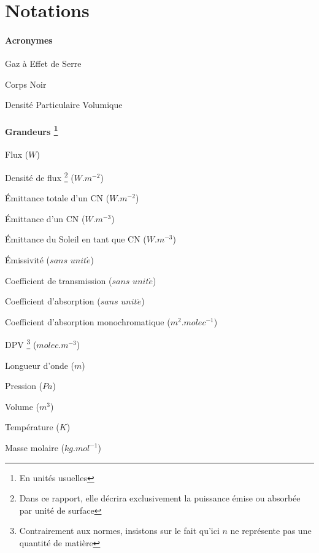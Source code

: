 \documentclass[a4paper, 12pt]{report} %
\begin{document}
\vfill


\newpage
\pagestyle{courant} 
\setcounter{tocdepth}{3} %
\tableofcontents %


\newpage
\chapter*{Notations} 

\begin{description}
	\subsubsection*{Acronymes}
    \item[GES:] Gaz à Effet de Serre
    \item[CN:] Corps Noir
    \item[DPV:] Densité Particulaire Volumique
    
	\subsubsection*{Grandeurs \footnote{En unités usuelles}}
    \item[\boldmath{$\Phi$}:] Flux  ($W$)
    \item[\boldmath{$\phi$}:] Densité de flux 
							\footnote{Dans ce rapport, elle décrira exclusivement la puissance 
							émise ou absorbée par unité de surface} ($W.m^{-2}$)
    \item[\boldmath{$M^{0}$}:] Émittance totale d'un CN ($W.m^{-2}$)
    \item[\boldmath{$M^{0}_{\lambda,T}$}:] Émittance d'un CN ($W.m^{-3}$)
    \item[\boldmath{$E^{0}_{\lambda,T}$}:] Émittance du Soleil en tant que CN ($W.m^{-3}$)
    \item[\boldmath{$\epsilon$}:] Émissivité ($sans$ $unit\acute e$)
    \item[\boldmath{$\tau$}:] Coefficient de transmission ($sans$ $unit\acute e$)
    \item[\boldmath{$\alpha$}:] Coefficient d'absorption ($sans$ $unit\acute e$)
    \item[\boldmath{$k_{abs}$}:] Coefficient d'absorption monochromatique ($m^2.molec^{-1}$)
    \item[\boldmath{$n$}:] DPV \footnote{Contrairement aux normes, insistons sur le fait qu'ici $n$ ne représente pas une quantité de matière} ($molec.m^{-3}$)
    \item[\boldmath{$\lambda$}:] Longueur d'onde ($m$)
    \item[\boldmath{$P$}:] Pression ($Pa$)
    \item[\boldmath{$V$}:] Volume ($m^3$)
    \item[\boldmath{$T$}:] Température ($K$)
    \item[\boldmath{$M$}:] Masse molaire ($kg.mol^{-1}$)
	

\end{description}
\end{document}

